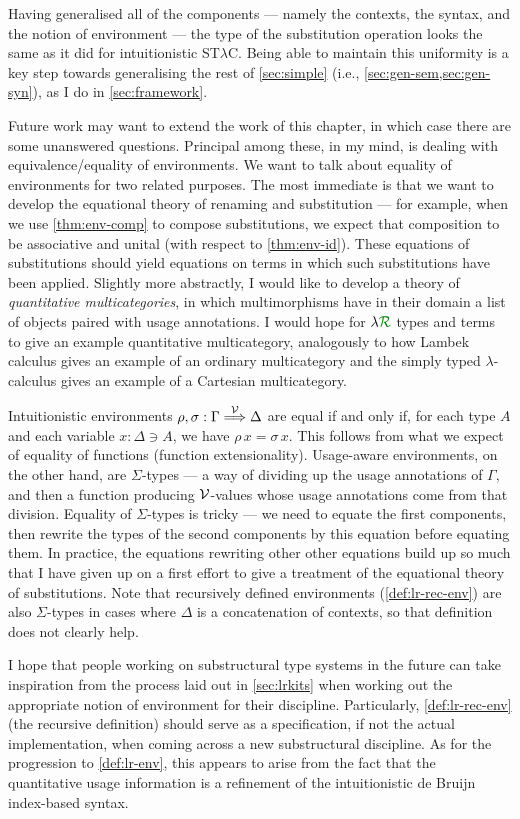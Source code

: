 Having generalised all of the components --- namely the contexts, the syntax,
and the notion of environment --- the type of the substitution operation looks
the same as it did for intuitionistic ST$\lambda$C\@.
Being able to maintain this uniformity is a key step towards generalising the
rest of \cref{sec:simple} (i.e., \cref{sec:gen-sem,sec:gen-syn}), as I do in
\cref{sec:framework}.

Future work may want to extend the work of this chapter, in which case
there are some unanswered questions.
Principal among these, in my mind, is dealing with equivalence/equality of
environments.
We want to talk about equality of environments for two related purposes.
The most immediate is that we want to develop the equational theory of renaming
and substitution --- for example, when we use \cref{thm:env-comp} to compose
substitutions, we expect that composition to be associative and unital (with
respect to \cref{thm:env-id}).
These equations of substitutions should yield equations on terms in which such
substitutions have been applied.
Slightly more abstractly, I would like to develop a theory of
\emph{quantitative multicategories}, in which multimorphisms have in their
domain a list of objects paired with usage annotations.
I would hope for $\name$ types and terms to give an example quantitative
multicategory, analogously to how Lambek calculus gives an example of an
ordinary multicategory and the simply typed $\lambda$-calculus gives an example
of a Cartesian multicategory.

Intuitionistic environments $\rho, \sigma : \Gamma \stackrel{\mathcal V}\Longrightarrow \Delta$ are equal
if and only if, for each type $A$ and each variable $x : \Delta \ni A$, we have
$\rho\,x = \sigma\,x$.
This follows from what we expect of equality of functions (function
extensionality).
Usage-aware environments, on the other hand, are $\Sigma$-types --- a way of
dividing up the usage annotations of $\Gamma$, and then a function producing
$\mathcal V$-values whose usage annotations come from that division.
Equality of $\Sigma$-types is tricky --- we need to equate the first components,
then rewrite the types of the second components by this equation before equating
them.
In practice, the equations rewriting other other equations build up so much that
I have given up on a first effort to give a treatment of the equational theory
of substitutions.
Note that recursively defined environments (\cref{def:lr-rec-env}) are also
$\Sigma$-types in cases where $\Delta$ is a concatenation of contexts, so that
definition does not clearly help.

I hope that people working on substructural type systems in the future can take
inspiration from the process laid out in \cref{sec:lrkits} when working out the
appropriate notion of environment for their discipline.
Particularly, \cref{def:lr-rec-env} (the recursive definition) should serve as a
specification, if not the actual implementation, when coming across a new
substructural discipline.
As for the progression to \cref{def:lr-env}, this appears to arise from the fact
that the quantitative usage information is a refinement of the intuitionistic de
Bruijn index-based syntax.
